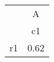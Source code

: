 \begin{tabular}{l*{1}{c}}
\hline\hline
            &           A\\
            &          c1\\
\hline
r1          &        0.62\\
\hline\hline
\end{tabular}
